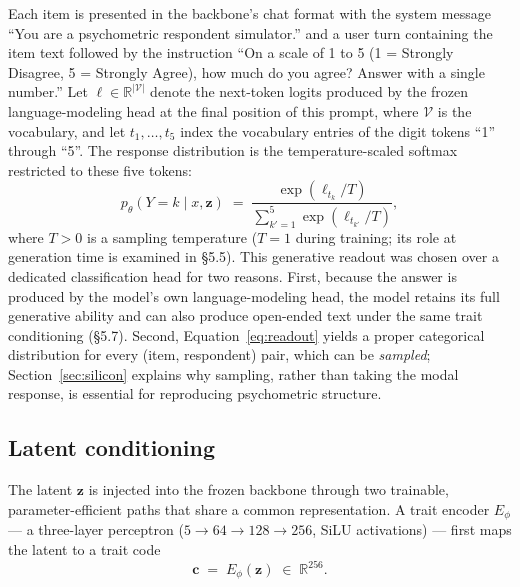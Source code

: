 \documentclass[11pt]{article}
\begin{document}
Each item is presented in the backbone's chat format with the system message ``You are a psychometric respondent simulator.'' and a user turn containing the item text followed by the instruction ``On a scale of 1 to 5 (1 = Strongly Disagree, 5 = Strongly Agree), how much do you agree? Answer with a single number.'' Let $\boldsymbol{\ell} \in \mathbb{R}^{|\mathcal{V}|}$ denote the next-token logits produced by the frozen language-modeling head at the final position of this prompt, where $\mathcal{V}$ is the vocabulary, and let $t_1, \dots, t_5$ index the vocabulary entries of the digit tokens ``1'' through ``5''. The response distribution is the temperature-scaled softmax restricted to these five tokens:
\begin{equation}
p_\theta\!\left(Y = k \mid x, \mathbf{z}\right) \;=\; \frac{\exp\!\left(\ell_{t_k} / T\right)}{\sum_{k'=1}^{5} \exp\!\left(\ell_{t_{k'}} / T\right)},
\label{eq:readout}
\end{equation}
where $T > 0$ is a sampling temperature ($T = 1$ during training; its role at generation time is examined in \S{}5.5). This generative readout was chosen over a dedicated classification head for two reasons. First, because the answer is produced by the model's own language-modeling head, the model retains its full generative ability and can also produce open-ended text under the same trait conditioning (\S{}5.7). Second, Equation~\ref{eq:readout} yields a proper categorical distribution for every (item, respondent) pair, which can be \textit{sampled}; Section~\ref{sec:silicon} explains why sampling, rather than taking the modal response, is essential for reproducing psychometric structure.

\subsection{Latent conditioning}
\label{sec:conditioning}

The latent $\mathbf{z}$ is injected into the frozen backbone through two trainable, parameter-efficient paths that share a common representation. A trait encoder $E_\phi$ --- a three-layer perceptron ($5 \to 64 \to 128 \to 256$, SiLU activations) --- first maps the latent to a trait code
\begin{equation}
\mathbf{c} \;=\; E_\phi(\mathbf{z}) \;\in\; \mathbb{R}^{256}.
\label{eq:traitcode}
\end{equation}
\end{document}
